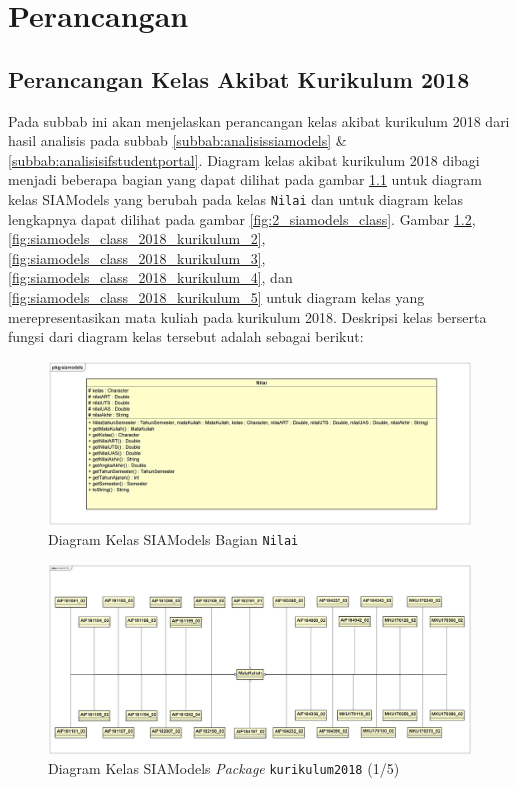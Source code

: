 \chapter{Perancangan}
\label{chap:perancangan}

\section{Perancangan Kelas Akibat Kurikulum 2018}

Pada subbab ini akan menjelaskan perancangan kelas akibat kurikulum 2018 dari hasil analisis pada subbab \ref{subbab:analisissiamodels} \& \ref{subbab:analisisifstudentportal}. Diagram kelas akibat kurikulum 2018 dibagi menjadi beberapa bagian yang dapat dilihat pada gambar \ref{fig:siamodels_class_2018} untuk diagram kelas SIAModels yang berubah pada kelas \texttt{Nilai} dan untuk diagram kelas lengkapnya dapat dilihat pada gambar \ref{fig:2_siamodels_class}. Gambar \ref{fig:siamodels_class_2018_kurikulum_1}, \ref{fig:siamodels_class_2018_kurikulum_2}, \ref{fig:siamodels_class_2018_kurikulum_3}, \ref{fig:siamodels_class_2018_kurikulum_4}, dan \ref{fig:siamodels_class_2018_kurikulum_5} untuk diagram kelas yang merepresentasikan mata kuliah pada kurikulum 2018. Deskripsi kelas berserta fungsi dari diagram kelas tersebut adalah sebagai berikut:

\begin{figure}[H]
\centering
\includegraphics[scale=0.15]{Gambar/class-diagram-siamodels-new}
\caption{Diagram Kelas SIAModels Bagian \texttt{Nilai}}
\label{fig:siamodels_class_2018}
\end{figure}

\begin{figure}[H]
\centering
\includegraphics[scale=0.4]{Gambar/class-diagram-siamodels-mk-kurikulum-2018-2}
\caption{Diagram Kelas SIAModels \textit{Package} \texttt{kurikulum2018} (1/5)}
\label{fig:siamodels_class_2018_kurikulum_1}
\end{figure}

